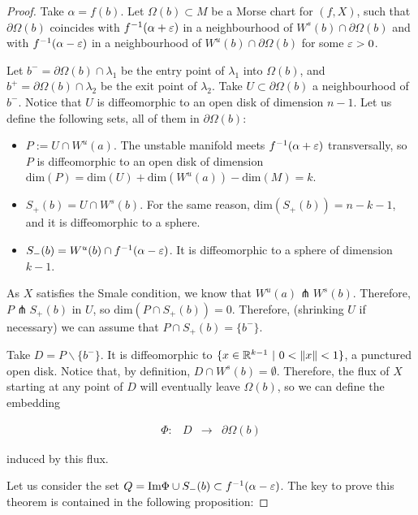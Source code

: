 \begin{proof}
Take $\alpha = f(b)$. Let $\Omega(b) \subset M$ be a Morse chart for $(f,X)$, such that $\partial\Omega(b)$ coincides with $f^{-1}(\alpha+\varepsilon)$ in a neighbourhood of $W^s(b) \cap \partial\Omega(b)$ and with $f^{-1}(\alpha-\varepsilon)$ in a neighbourhood of $W^u(b) \cap \partial\Omega(b)$ for some $\varepsilon > 0$.

Let $b^- = \partial\Omega(b) \cap \lambda_1$ be the entry point of $\lambda_1$ into $\Omega(b)$, and $b^+ = \partial\Omega(b) \cap \lambda_2$ be the exit point of $\lambda_2$. Take $U \subset \partial\Omega(b)$ a neighbourhood of $b^-$. Notice that $U$ is diffeomorphic to an open disk of dimension $n-1$. Let us define the following sets, all of them in $\partial\Omega(b)$:

\begin{itemize}
	\item $P := U \cap W^u(a)$. The unstable manifold meets $f^{-1}(\alpha+\varepsilon)$ transversally, so $P$ is diffeomorphic to an open disk of dimension $\text{dim}(P) = \text{dim}(U) + \text{dim}(W^u(a)) - \text{dim}(M) = k$.
	\item $S_+(b) = U \cap W^s(b)$. For the same reason, $\text{dim}(S_+(b)) = n - k - 1$, and it is diffeomorphic to a sphere.
	\item $S_-(b) = W^u(b) \cap f^{-1}(\alpha-\varepsilon)$. It is diffeomorphic to a sphere of dimension $k-1$.
\end{itemize}

As $X$ satisfies the Smale condition, we know that $W^u(a) \pitchfork W^s(b)$. Therefore, $P \pitchfork S_+(b)$ in $U$, so $\text{dim}(P \cap S_+(b)) = 0$. Therefore, (shrinking $U$ if necessary) we can assume that $P \cap S_+(b) = \{b^-\}$.

Take $D = P \backslash \{b^-\}$. It is diffeomorphic to $\{x \in \R^{k-1} \ | \ 0 < \|x\| < 1\}$, a punctured open disk. Notice that, by definition, $D \cap W^s(b) = \emptyset$. Therefore, the flux of $X$ starting at any point of $D$ will eventually leave $\Omega(b)$, so we can define the embedding

$$\begin{array}{rccc} \Phi : & D & \longrightarrow & \partial\Omega(b) \end{array}$$

induced by this flux.

Let us consider the set $Q = \text{Im} \Phi \cup S_-(b) \subset f^{-1}(\alpha-\varepsilon)$. The key to prove this theorem is contained in the following proposition:


\end{proof}
